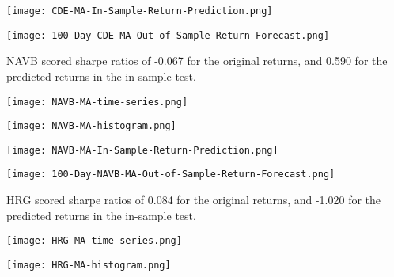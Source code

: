 \begin{center}  
    \texttt{[image: CDE-MA-In-Sample-Return-Prediction.png]}
    \label{fig:nonfloat}
\end{center}

\begin{center}
    \texttt{[image: 100-Day-CDE-MA-Out-of-Sample-Return-Forecast.png]}
    \label{fig:nonfloat}
\end{center}

NAVB scored sharpe ratios of -0.067 for the original returns, and 0.590 for the predicted returns in the in-sample test.

\begin{center}  
    \texttt{[image: NAVB-MA-time-series.png]}
    \label{fig:nonfloat}
\end{center}

\begin{center}  
    \texttt{[image: NAVB-MA-histogram.png]}
    \label{fig:nonfloat}
\end{center}

\begin{center}
    \texttt{[image: NAVB-MA-In-Sample-Return-Prediction.png]}
    \label{fig:nonfloat}
\end{center}

\begin{center}
    \texttt{[image: 100-Day-NAVB-MA-Out-of-Sample-Return-Forecast.png]}
    \label{fig:nonfloat}
\end{center}

HRG scored sharpe ratios of 0.084 for the original returns, and -1.020 for the predicted returns in the in-sample test.

\begin{center}  
    \texttt{[image: HRG-MA-time-series.png]}
    \label{fig:nonfloat}
\end{center}

\begin{center}  
    \texttt{[image: HRG-MA-histogram.png]}
    \label{fig:nonfloat}
\end{center}

